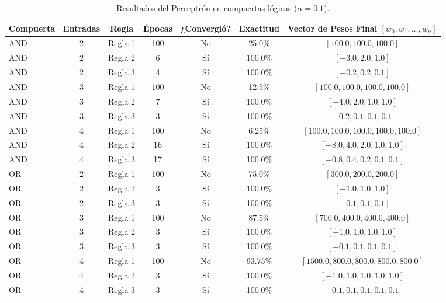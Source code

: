 \documentclass{article}
\begin{document}
\begin{table}[H]
\centering
\caption{Resultados del Perceptrón en compuertas lógicas ($\alpha = 0.1$).}
\label{tab:compuertas_p}
\begin{adjustbox}{max width=\textwidth}
\begin{tabular}{lcccccc}
\toprule
\textbf{Compuerta} & \textbf{Entradas} & \textbf{Regla} & \textbf{Épocas} & \textbf{¿Convergió?} & \textbf{Exactitud} & \textbf{Vector de Pesos Final $[w_0, w_1, \dots, w_n]$} \\
\midrule
AND & 2 & Regla 1 & 100 & No & 25.0\% & $[100.0, 100.0, 100.0]$ \\
AND & 2 & Regla 2 & 6 & Sí & 100.0\% & $[-3.0, 2.0, 1.0]$ \\
AND & 2 & Regla 3 & 4 & Sí & 100.0\% & $[-0.2, 0.2, 0.1]$ \\
\midrule
AND & 3 & Regla 1 & 100 & No & 12.5\% & $[100.0, 100.0, 100.0, 100.0]$ \\
AND & 3 & Regla 2 & 7 & Sí & 100.0\% & $[-4.0, 2.0, 1.0, 1.0]$ \\
AND & 3 & Regla 3 & 3 & Sí & 100.0\% & $[-0.2, 0.1, 0.1, 0.1]$ \\
\midrule
AND & 4 & Regla 1 & 100 & No & 6.25\% & $[100.0, 100.0, 100.0, 100.0, 100.0]$ \\
AND & 4 & Regla 2 & 16 & Sí & 100.0\% & $[-8.0, 4.0, 2.0, 1.0, 1.0]$ \\
AND & 4 & Regla 3 & 17 & Sí & 100.0\% & $[-0.8, 0.4, 0.2, 0.1, 0.1]$ \\
\midrule
OR  & 2 & Regla 1 & 100 & No & 75.0\% & $[300.0, 200.0, 200.0]$ \\
OR  & 2 & Regla 2 & 3 & Sí & 100.0\% & $[-1.0, 1.0, 1.0]$ \\
OR  & 2 & Regla 3 & 3 & Sí & 100.0\% & $[-0.1, 0.1, 0.1]$ \\
\midrule
OR  & 3 & Regla 1 & 100 & No & 87.5\% & $[700.0, 400.0, 400.0, 400.0]$ \\
OR  & 3 & Regla 2 & 3 & Sí & 100.0\% & $[-1.0, 1.0, 1.0, 1.0]$ \\
OR  & 3 & Regla 3 & 3 & Sí & 100.0\% & $[-0.1, 0.1, 0.1, 0.1]$ \\
\midrule
OR  & 4 & Regla 1 & 100 & No & 93.75\% & $[1500.0, 800.0, 800.0, 800.0, 800.0]$ \\
OR  & 4 & Regla 2 & 3 & Sí & 100.0\% & $[-1.0, 1.0, 1.0, 1.0, 1.0]$ \\
OR  & 4 & Regla 3 & 3 & Sí & 100.0\% & $[-0.1, 0.1, 0.1, 0.1, 0.1]$ \\
\bottomrule
\end{tabular}
\end{adjustbox}
\end{table}
\end{document}
